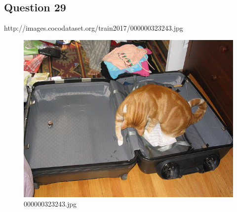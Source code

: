     \subsection*{Question 29}
    http://images.cocodataset.org/train2017/000000323243.jpg
    \begin{figure}[h]
        \centering
        \includegraphics[width=0.8\linewidth]{../image set/easy/000000323243.jpg}
        \caption{000000323243.jpg}
    \end{figure}
